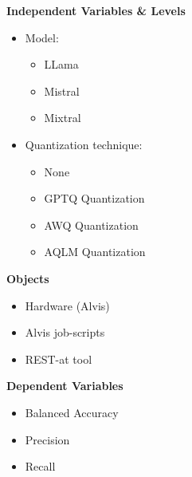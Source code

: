 \begin{figure}[h]
\begin{center}
    \begin{tcbraster}[raster columns=2, raster column skip=5pt, raster equal height=rows, raster row skip=5pt]
        \begin{roundedBox}
            \centering
            \textbf{Independent Variables \& Levels}
            \begin{itemize}
                \item Model:
                \begin{itemize}
                    \item LLama
                    \item Mistral
                    \item Mixtral
                \end{itemize}
                \item Quantization technique:
                \begin{itemize}
                    \item None
                    \item GPTQ Quantization
                    \item AWQ Quantization
                    \item AQLM Quantization
                \end{itemize}
            \end{itemize}
        \end{roundedBox}
        \begin{roundedBox}
            \centering
            \textbf{Objects}
            \begin{itemize}
                \item Hardware (Alvis)
                \item Alvis job-scripts
                \item REST-at tool
            \end{itemize}
        \end{roundedBox}
        \begin{roundedBox}
            \centering
            \textbf{Dependent Variables}
            \begin{itemize}
                \item Balanced Accuracy
                \item Precision
                \item Recall

\end{itemize}
\end{roundedBox}
\end{tcbraster}
\end{center}
\end{figure}

